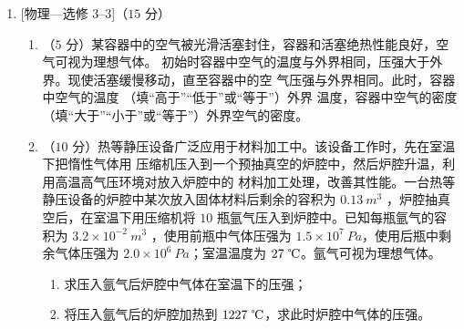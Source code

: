 \begin{enumerate}
{}



\newpage
\begin{enumerate}[leftmargin=-2em]
\renewcommand{\labelenumii}{}
\item
{}
\end{enumerate}


\item 

[物理—选修 $ 3 $–$ 3 $]（$ 15 $ 分）


\begin{enumerate}
\renewcommand{\labelenumi}{\arabic{enumi}.}
\item
（$ 5 $ 分）某容器中的空气被光滑活塞封住，容器和活塞绝热性能良好，空气可视为理想气体。
初始时容器中空气的温度与外界相同，压强大于外界。现使活塞缓慢移动，直至容器中的空
气压强与外界相同。此时，容器中空气的温度  （填“高于”“低于”或“等于”）外界
温度，容器中空气的密度  （填“大于”“小于”或“等于”）外界空气的密度。



\item 
（$ 10 $ 分）热等静压设备广泛应用于材料加工中。该设备工作时，先在室温下把惰性气体用
压缩机压入到一个预抽真空的炉腔中，然后炉腔升温，利用高温高气压环境对放入炉腔中的
材料加工处理，改善其性能。一台热等静压设备的炉腔中某次放入固体材料后剩余的容积为
$ 0.13 \ m^{3} $ ，炉腔抽真空后，在室温下用压缩机将 $ 10 $ 瓶氩气压入到炉腔中。已知每瓶氩气的容
积为 $ 3.2 \times 10^{-2} \ m^{3} $ ，使用前瓶中气体压强为 $ 1.5 \times 10^{7} \ Pa $，使用后瓶中剩余气体压强为
$ 2.0 \times 10^{6} \ Pa $；室温温度为 $ 27 \ \celsius $。氩气可视为理想气体。
\begin{enumerate}
\renewcommand{\labelenumiii}{\roman{enumiii}.}
\item
求压入氩气后炉腔中气体在室温下的压强；
\item 
将压入氩气后的炉腔加热到 $ 1227 \ \celsius $，求此时炉腔中气体的压强。





\end{enumerate}
\end{enumerate}
\end{enumerate}
